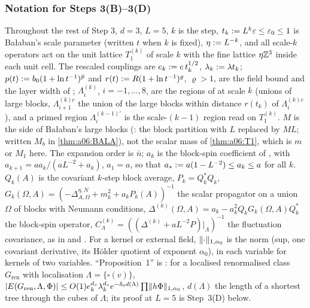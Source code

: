 
\subsubsection*{Notation for Steps 3(B)--3(D)}
Throughout the rest of Step 3, $d=3$, $L=5$, $k$ is the step, $t_k:= L^k\varepsilon\le\varepsilon_0\le1$ is Ba{\l}aban's scale parameter (written $t$ when $k$ is fixed), $\eta:= L^{-k}$, and all scale-$k$ operators act on the unit lattice $T^{(k)}_1$ of scale $k$ with the fine lattice $\eta\mathbb Z^3$ inside each unit cell. The rescaled couplings are $e_k:= e\,t_k^{1/2}$, $\lambda_k:=\lambda t_k$; $p(t):= b_0(1+\ln t^{-1})^{\bar p}$ and $r(t):= R(1+\ln t^{-1})^{\varrho}$, $\varrho>1$, are the field bound and the layer width of \cite[(2.7), (2.16)--(2.17)]{Ba2}; $\Lambda^{(k)}_i$, $i=-1,\dots,8$, are the regions of \cite[(2.8)]{Ba2} at scale $k$ (unions of large blocks, $\Lambda^{(k)c}_{i+1}$ the union of the large blocks within distance $r(t_k)$ of $\Lambda^{(k)c}_i$), and a primed region $\Lambda^{(k-1)'}_i$ is the scale-$(k-1)$ region read on $T^{(k)}_1$. $M$ is the side of Ba{\l}aban's large blocks (\cite[p.~607]{Ba1}: the block partition with $L$ replaced by $ML$; written $M_b$ in \cref{thm:a06:BALA}), not the scalar mass of \cref{thm:a06:T1}, which is $m$ or $M_1$ here. The expansion order is $\bar n$; $a_k$ is the block-spin coefficient of \cite[(2.13)]{Ba1}, with $a_{k+1}=aa_k/(aL^{-2}+a_k)$, $a_1=a$, so that $a_*:= a(1-L^{-2})\le a_k\le a$ for all $k$. $Q_k(A)$ is the covariant $k$-step block average, $P_k=Q_k^*Q_k$, $G_k(\Omega,A)=(-\Delta^{\eta,N}_{A,\Omega}+m_k^2+a_kP_k(A))^{-1}$ the scalar propagator on a union $\Omega$ of blocks with Neumann conditions, $\Delta^{(k)}(\Omega,A)=a_k-a_k^2Q_kG_k(\Omega,A)Q_k^*$ the block-spin operator, $C^{(k)}_\Lambda=((\Delta^{(k)}+aL^{-2}P)|_\Lambda)^{-1}$ the fluctuation covariance, as in \cite[Sect.~2]{Ba1} and \cite[Sect.~1]{Ba4}. For a kernel or external field, $\lVert \cdot\rVert_{1,\alpha_0}$ is the norm \cite[(1.32)]{Ba3} (sup, one covariant derivative, its H\"older quotient of exponent $\alpha_0$), in each variable for kernels of two variables. ``Proposition~1'' is \cite[Prop.~1, (1.33)]{Ba3}: for a localised renormalised class $G_{\mathrm{ren}}$ with localisation $\Lambda=\{\square(v)\}$, $|E(G_{\mathrm{ren}},\Lambda,\Phi)|\le O(1)e_k^{d_v}\lambda_k^{d_s}e^{-\delta_0d(\Lambda)}\prod\lVert h\Phi\rVert_{1,\alpha_0}$, $d(\Lambda)$ the length of a shortest tree through the cubes of $\Lambda$; its proof at $L=5$ is Step~3(D) below.

